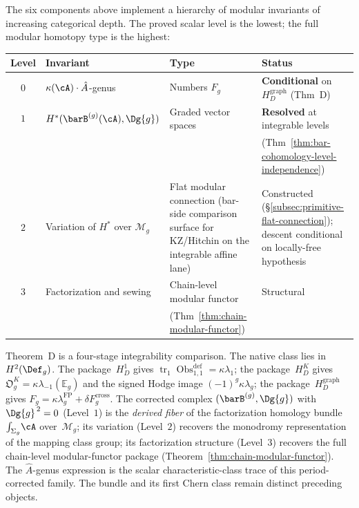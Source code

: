 \begin{remark}%
\label{rem:four-levels}%
%
The six components above implement a hierarchy of modular
invariants of increasing categorical depth.
The proved scalar level is the lowest;
the full modular homotopy type is the highest:
\begin{center}
\renewcommand{\arraystretch}{1.3}
\begin{tabular}{@{}clll@{}}
\toprule
\textbf{Level} & \textbf{Invariant} & \textbf{Type} & \textbf{Status} \\
\midrule
$0$ & $\kappa(\cA) \cdot \hat{A}$-genus
 & Numbers $F_g$ & \textbf{Conditional} on $H_D^{\mathrm{graph}}$
 (Thm~D) \\[2pt]
$1$ & $H^*(\barB^{(g)}(\cA), \Dg{g})$
 & Graded vector spaces & \textbf{Resolved} at integrable levels \\
 & & & (Thm~\ref{thm:bar-cohomology-level-independence}) \\[2pt]
$2$ & Variation of $H^*$ over $\mathcal{M}_g$
 & Flat modular connection
 \textup{(}bar-side comparison surface for KZ/Hitchin on the
 integrable affine lane\textup{)} & Constructed
 (\S\ref{subsec:primitive-flat-connection}); descent
 conditional on locally-free hypothesis \\[2pt]
$3$ & Factorization and sewing
 & Chain-level modular functor & Structural \\
 & & (Thm~\ref{thm:chain-modular-functor}) & \\
\bottomrule
\end{tabular}
\end{center}
Theorem~D is a four-stage integrability comparison.  The native class
lies in $H^2(\Def_g)$.  The package~$H_D^1$ gives
$\operatorname{tr}_1\operatorname{Obs}^{\mathrm{def}}_{1,1}
=\kappa\lambda_1$; the package~$H_D^K$ gives
$\mathfrak O_g^K=\kappa\lambda_{-1}(\mathbb E_g)$ and the signed
Hodge image $(-1)^g\kappa\lambda_g$; the package~$H_D^{\mathrm{graph}}$
gives $F_g=\kappa\lambda_g^{\mathrm{FP}}
+\delta F_g^{\mathrm{cross}}$.
The corrected complex $(\barB^{(g)}, \Dg{g})$ with
$\Dg{g}^{\,2} = 0$ (Level~$1$) is the
\emph{derived fiber} of the factorization homology bundle
$\int_{\Sigma_g}\!\cA$ over~$\mathcal{M}_g$; its variation
(Level~$2$) recovers the monodromy representation of the mapping
class group; its factorization structure (Level~$3$) recovers the
full chain-level modular-functor package
(Theorem~\ref{thm:chain-modular-functor}). The $\hat{A}$-genus
expression is the scalar characteristic-class trace of this
period-corrected family.  The bundle and its first Chern class remain
distinct preceding objects.


\end{remark}
